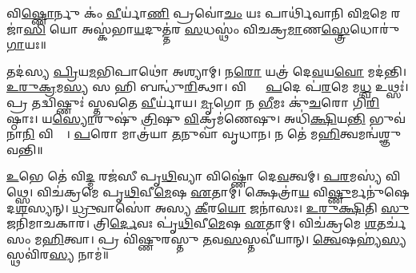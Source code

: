


𑌵𑌿\ul{𑌷𑍍𑌣𑍋}𑌰𑍍𑌨𑍁 𑌕𑌂॑ \ul{𑌵𑍀}𑌰𑍍𑌯𑌾॑\ul{𑌣𑌿} 𑌪𑍍𑌰𑌵𑍋॑\ul{𑌚𑌂} 𑌯𑌃 𑌪𑌾𑌰𑍍𑌥𑌿॑𑌵𑌾𑌨𑌿 𑌵𑌿\ul{𑌮}𑌮𑍇 𑌰𑌜𑌾॑\ul{𑌸𑌿} 𑌯𑍋 𑌅𑌸𑍍𑌕॑𑌭𑌾\ul{𑌯}𑌦𑍁𑌤𑍍𑌤॑𑌰 \ul{𑌸}𑌧𑌸𑍍𑌥𑌂॑ 𑌵𑌿𑌚𑌕𑍍𑌰\ul{𑌮𑌾}𑌣\ul{𑌸𑍍𑌤𑍍𑌰𑍇}𑌧𑍋𑌰𑍁॑\ul{𑌗𑌾}𑌯𑌃॥ 

𑌤𑌦॑𑌸𑍍𑌯 \ul{𑌪𑍍𑌰𑌿}𑌯\ul{𑌮}𑌭𑌿𑌪𑌾𑌥𑍋॑ 𑌅𑌶𑍍𑌯𑌾𑌮𑍍। 𑌨\ul{𑌰𑍋} 𑌯𑌤𑍍𑌰॑ 𑌦𑍇\ul{𑌵}𑌯\ul{𑌵𑍋} 𑌮𑌦॑𑌨𑍍𑌤𑌿। \ul{𑌉}\ul{𑌰𑍁}\ul{𑌕𑍍𑌰}𑌮\ul{𑌸𑍍𑌯} 𑌸 𑌹𑌿 𑌬𑌨𑍍𑌧𑍁॑\ul{𑌰𑌿}𑌤𑍍𑌥𑌾। 𑌵𑌿𑌷𑍍𑌣𑍋𑌃᳚ \ul{𑌪}𑌦𑍇 𑌪॑\ul{𑌰}𑌮𑍇 𑌮\ul{𑌧𑍍𑌵} 𑌉𑌥𑍍𑌸𑌃॑। 𑌪𑍍𑌰 𑌤𑌦𑍍𑌵𑌿𑌷𑍍𑌣𑍁𑌃॑  𑌸𑍍𑌤𑌵𑌤𑍇 \ul{𑌵𑍀}𑌰𑍍𑌯𑌾॑𑌯। \ul{𑌮𑍃}𑌗𑍋 𑌨 \ul{𑌭𑍀}𑌮𑌃 𑌕𑍁॑\ul{𑌚}𑌰𑍋 𑌗𑌿॑\ul{𑌰𑌿}𑌷𑍍𑌠𑌾𑌃। 𑌯\ul{𑌸𑍍𑌯𑍋}𑌰𑍁𑌷𑍁॑ \ul{𑌤𑍍𑌰𑌿}𑌷𑍁 \ul{𑌵𑌿}𑌕𑍍𑌰𑌮॑𑌣𑍇𑌷𑍁। 𑌅𑌧𑌿॑\ul{𑌕𑍍𑌷𑌿}𑌯\ul{𑌨𑍍𑌤𑌿} 𑌭𑍁𑌵॑𑌨𑌾\ul{𑌨𑌿} 𑌵𑌿𑌶𑍍𑌵𑌾᳚। \ul{𑌪}𑌰𑍋 𑌮𑌾𑌤𑍍𑌰॑𑌯𑌾 \ul{𑌤}𑌨𑍁𑌵𑌾॑ 𑌵𑍃𑌧𑌾𑌨। 𑌨 𑌤𑍇॑ 𑌮\ul{𑌹𑌿}𑌤𑍍𑌵𑌮𑌨𑍍𑌵॑𑌶𑍍𑌞𑍁𑌵𑌨𑍍𑌤𑌿॥ 

\ul{𑌉}𑌭𑍇 𑌤𑍇॑ 𑌵𑌿\ul{𑌦𑍍𑌮} 𑌰𑌜॑𑌸𑍀 𑌪𑍃\ul{𑌥𑌿}𑌵𑍍𑌯𑌾 𑌵𑌿𑌷𑍍𑌣𑍋॑ 𑌦𑍇\ul{𑌵}𑌤𑍍𑌵𑌮𑍍। \ul{𑌪}\ul{𑌰}𑌮𑌸𑍍𑌯॑ 𑌵𑌿𑌥𑍍𑌸𑍇। 𑌵𑌿𑌚॑𑌕𑍍𑌰𑌮𑍇 𑌪𑍃\ul{𑌥𑌿}𑌵𑍀\ul{𑌮𑍇}𑌷 \ul{𑌏}𑌤𑌾𑌮𑍍। 𑌕𑍍𑌷𑍇𑌤𑍍𑌰𑌾॑\ul{𑌯} 𑌵𑌿\ul{𑌷𑍍𑌣𑍁}𑌰𑍍𑌮𑌨𑍁॑𑌷𑍇 𑌦\ul{𑌶}𑌸𑍍𑌯𑌨𑍍। \ul{𑌧𑍍𑌰𑍁}𑌵𑌾𑌸𑍋॑ 𑌅𑌸𑍍𑌯 \ul{𑌕𑍀}𑌰\ul{𑌯𑍋} 𑌜𑌨𑌾॑𑌸𑌃। \ul{𑌉}\ul{𑌰𑍁}\ul{𑌕𑍍𑌷𑌿}𑌤𑌿 \ul{𑌸𑍁}𑌜𑌨𑌿॑𑌮𑌾𑌚𑌕𑌾𑌰। 𑌤𑍍𑌰𑌿\ul{𑌰𑍍𑌦𑍇}𑌵𑌃 𑌪𑍃॑\ul{𑌥𑌿}𑌵𑍀\ul{𑌮𑍇}𑌷 \ul{𑌏}𑌤𑌾𑌮𑍍। 𑌵𑌿𑌚॑𑌕𑍍𑌰𑌮𑍇 \ul{𑌶}𑌤𑌰𑍍𑌚॑𑌸𑌂 𑌮\ul{𑌹𑌿}𑌤𑍍𑌵𑌾। 𑌪𑍍𑌰 𑌵𑌿॑𑌷𑍍𑌣𑍁𑌰𑌸𑍍𑌤𑍁 \ul{𑌤}𑌵\ul{𑌸}𑌸𑍍𑌤𑌵𑍀॑𑌯𑌾𑌨𑍍। \ul{𑌤𑍍𑌵𑍇}𑌷𑌹𑍍𑌯॑\ul{𑌸𑍍𑌯} 𑌸𑍍𑌥𑌵𑌿॑𑌰\ul{𑌸𑍍𑌯} 𑌨𑌾𑌮॑॥ 

